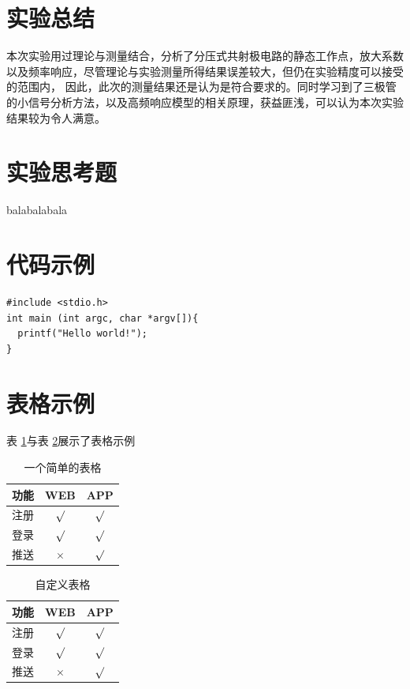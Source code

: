 \documentclass[a4paper,11pt,UTF8]{ctexart}
\begin{document}
\section{实验总结}
本次实验用过理论与测量结合，分析了分压式共射极电路的静态工作点，放大系数以及频率响应，尽管理论与实验测量所得结果误差较大，但仍在实验精度可以接受的范围内，
因此，此次的测量结果还是认为是符合要求的。同时学习到了三极管的小信号分析方法，以及高频响应模型的相关原理，获益匪浅，可以认为本次实验结果较为令人满意。
\section{实验思考题}
balabalabala

\begin{appendix}

\section{代码示例}

\begin{lstlisting}[caption={一段C代码},captionpos=b]
#include <stdio.h>
int main (int argc, char *argv[]){
  printf("Hello world!");
}
\end{lstlisting}

\section{表格示例}
表 \ref{tab:tab1}与表 \ref{tab:tab2}展示了表格示例
\begin{table}[!h!tbp]
\caption{一个简单的表格}\label{tab:tab1}
  \centering
  \begin{tabular}{|l|c|c|}
	\hline
	功能          &WEB         &APP         \\ \hline
	注册          &$\surd$     &$\surd$     \\ \hline
	登录          &$\surd$     &$\surd$     \\ \hline
	推送          &$\times$    &$\surd$     \\ \hline
\end{tabular}
\end{table}

\begin{table}[!h!tbp]
\caption{自定义表格}\label{tab:tab2}
  \centering
\begin{tabular*}{0.75\textwidth}{@{\extracolsep{\fill}}lcc}
    \toprule
    功能          &WEB         &APP         \\
    \midrule
    注册          &$\surd$     &$\surd$     \\
    登录          &$\surd$     &$\surd$     \\
    推送          &$\times$    &$\surd$     \\
    \bottomrule
\end{tabular*}
\end{table}



\end{appendix}
\end{document}
